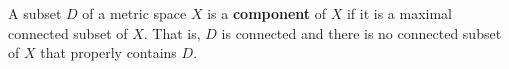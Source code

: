 A subset $D$ of a metric space $X$ is a \textbf{component} of $X$ if it is a maximal connected subset of $X$. That is, $D$ is connected and there is no connected subset of $X$ that properly contains $D$.
